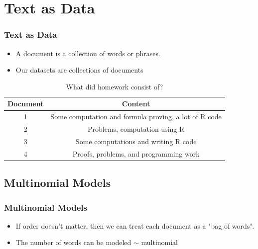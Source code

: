 \documentclass[handout]{beamer}
\begin{document}
\section{Text as Data }
\begin{frame}
 \frametitle{Text as Data}
 \begin{itemize}
\pause
\item A document is a collection of words or phrases.
\pause
\item Our datasets are collections of documents
\end{itemize}
\pause
\begin{table}[!hbpt]
\caption{What did homework consist of? } \label{tab:title}
\pause
\begin{center}
\begin{tabular} {c c}
\textbf{Document} & \textbf{Content} \\
\hline
1 & Some computation and formula proving, a lot of R code \\
2 & Problems, computation using R \\
3 & Some computations and writing R code\\
4 & Proofs, problems, and programming work \\
\end{tabular}
\end{center}
\end{table}
\end{frame}

\subsection[Basic Structure]{Multinomial Models}
\begin{frame}
\pause
\frametitle{Multinomial Models}
\begin{itemize}
\item If order doesn't matter, then we can treat each document as a "bag of words". 
\pause
\item The number of words can be modeled $\sim$ multinomial
\pause
\end{itemize}
\begin{table}[!hbpt]
\caption{Creating a word-count matrix from text}
\begin{center}
\end{center}
\end{table} 
\end{frame}
\end{document}
